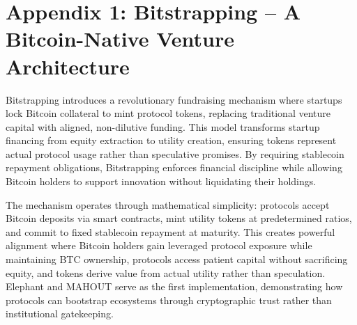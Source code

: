 \chapter{Appendix 1: Bitstrapping – A Bitcoin-Native Venture Architecture}

Bitstrapping introduces a revolutionary fundraising mechanism where startups lock Bitcoin collateral to mint protocol tokens, replacing traditional venture capital with aligned, non-dilutive funding. This model transforms startup financing from equity extraction to utility creation, ensuring tokens represent actual protocol usage rather than speculative promises. By requiring stablecoin repayment obligations, Bitstrapping enforces financial discipline while allowing Bitcoin holders to support innovation without liquidating their holdings.

The mechanism operates through mathematical simplicity: protocols accept Bitcoin deposits via smart contracts, mint utility tokens at predetermined ratios, and commit to fixed stablecoin repayment at maturity. This creates powerful alignment where Bitcoin holders gain leveraged protocol exposure while maintaining BTC ownership, protocols access patient capital without sacrificing equity, and tokens derive value from actual utility rather than speculation. Elephant and MAHOUT serve as the first implementation, demonstrating how protocols can bootstrap ecosystems through cryptographic trust rather than institutional gatekeeping.

